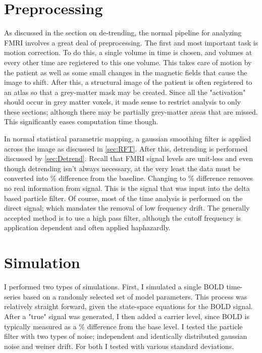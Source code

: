 \section{Preprocessing}
\label{sec:Methods Preprocessing}
As discussed in the section on de-trending, the normal pipeline for analyzing
FMRI involves a great deal of preprocessing. The first and most important
task is motion correction. To do this, a single volume in time is chosen, and
volumes at every other time are registered to this one volume. This takes care
of motion by the patient as well as some small changes in the magnetic
fields that cause the image to shift. After this, a structural image of the
patient is often registered to an atlas so that a grey-matter mask may
be created. Since all the "activation" should occur in grey matter voxels,
it made sense to restrict analysis to only these sections; although
there may be partially grey-matter areas that are missed. This significantly
eases computation time though. 

In normal statistical parametric mapping, a gaussian smoothing
filter is applied across the image as discussed in \autoref{sec:RFT}.
After this, detrending is performed discussed by \autoref{sec:Detrend}.
Recall that FMRI signal levels are unit-less and even though detrending isn't
always necessary, at the very least the data must be converted 
into \% difference from the baseline. Changing to 
\% difference removes no real information
from signal. This is the signal that was input into the delta based 
particle filter. Of course, most of the time analysis is performed on the
direct signal; which mandates the removal of low frequency drift.
The generally accepted method is to use a high pass filter, although the
cutoff frequency is application dependent and often applied haphazardly.


\section{Simulation}
I performed two types of simulations. First, I simulated a single BOLD time-series based
on a randomly selected set of model parameters. This process was relatively straight forward,
given the state-space equations for the BOLD signal. After a "true" signal was generated,
I then added a carrier level, since BOLD is typically measured as a \% difference from the
base level. I tested the particle filter with two types of noise; independent and identically
distributed gaussian noise and weiner drift. For both I tested with various standard deviations.

